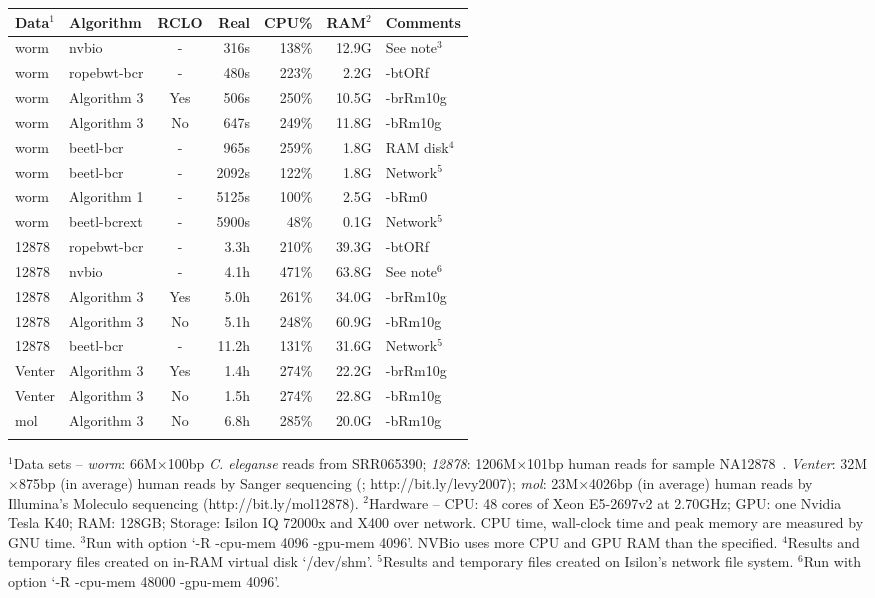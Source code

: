 \documentclass{bioinfo}
\begin{document}
\begin{table}[b]
{\footnotesize
\begin{tabular}{llcrrrl}
\toprule
Data$^1$& Algorithm&RCLO& Real  & CPU\% &RAM$^2$& Comments\\
\midrule
worm & nvbio       & -  & 316s  & 138\%&12.9G & See note$^3$\\
worm & ropebwt-bcr & -  & 480s  & 223\%&2.2G & -btORf\\
worm & Algorithm 3 & Yes& 506s  & 250\%&10.5G & -brRm10g \\
worm & Algorithm 3 & No & 647s  & 249\%&11.8G & -bRm10g \\
worm & beetl-bcr   & -  & 965s  & 259\%&1.8G & RAM disk$^4$\\
worm & beetl-bcr   & -  & 2092s & 122\%&1.8G & Network$^5$\\
worm & Algorithm 1 & -  & 5125s & 100\%&2.5G & -bRm0 \\
worm & beetl-bcrext& -  & 5900s &  48\%&0.1G & Network$^5$\\
12878&ropebwt-bcr  & -  & 3.3h & 210\%&39.3G & -btORf \\
12878&nvbio        & -  &4.1h  & 471\%&63.8G & See note$^6$\\
12878&Algorithm 3  & Yes&5.0h  & 261\%&34.0G & -brRm10g \\
12878&Algorithm 3  & No &5.1h  & 248\%&60.9G & -bRm10g \\
12878&beetl-bcr    & -  &11.2h & 131\%&31.6G & Network$^5$\\
Venter&Algorithm 3 & Yes& 1.4h & 274\%&22.2G & -brRm10g \\
Venter&Algorithm 3 & No & 1.5h & 274\%&22.8G & -bRm10g \\
mol  &Algorithm 3  & No & 6.8h & 285\%&20.0G & -bRm10g \\

\botrule
\end{tabular}}{$^1$Data sets --
{\it worm}: 66M$\times$100bp {\it C. eleganse} reads from SRR065390;
{\it 12878}: 1206M$\times$101bp human reads for sample NA12878~\citep{Depristo:2011vn}.
{\it Venter}: 32M$\times$875bp (in average) human reads by Sanger sequencing (\citealt*{Levy:2007uq}; http://bit.ly/levy2007);
{\it mol}: 23M$\times$4026bp (in average) human reads by Illumina's Moleculo sequencing (http://bit.ly/mol12878).
$^2$Hardware -- CPU: 48 cores of
Xeon E5-2697v2 at 2.70GHz; GPU: one Nvidia Tesla K40; RAM: 128GB; Storage:
Isilon IQ 72000x and X400 over network. CPU time, wall-clock time and peak
memory are measured by GNU time. $^3$Run with option `-R -cpu-mem 4096 -gpu-mem
4096'. NVBio uses more CPU and GPU RAM than the specified. $^4$Results and
temporary files created on in-RAM virtual disk `/dev/shm'. $^5$Results and
temporary files created on Isilon's network file system. $^6$Run with
option `-R -cpu-mem 48000 -gpu-mem 4096'.}
\end{table}
\end{document}
